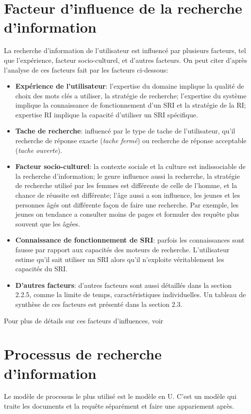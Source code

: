 \section{Facteur d'influence de la recherche d'information}
La recherche d'information de l'utilisateur est influencé par plusieurs facteurs, tel que l'expérience, facteur socio-culturel, et d'autres facteurs.
On peut citer d'après l'analyse de ces facteurs fait par \citeauthor{ri-sur-le-web} \citep{ri-sur-le-web} les facteurs ci-dessous:
\begin{itemize}
    \item \textbf{Expérience de l'utilisateur}: l'expertise du domaine implique la qualité de choix des mots clés a utiliser, la stratégie de recherche; l'expertise du système implique la connaissance de fonctionnement d'un SRI et la stratégie de la RI; expertise RI implique la capacité d'utiliser un SRI spécifique.
    \item \textbf{Tache de recherche}: influencé par le type de tache de l'utilisateur, qu'il recherche de réponse exacte (\textit{tache fermé}) ou recherche de réponse acceptable (\textit{tache ouverte}).
    \item \textbf{Facteur socio-culturel}: la contexte sociale et la culture est indissociable de la recherche d'information; le genre influence aussi la recherche, la stratégie de recherche utilisé par les femmes est différente de celle de l'homme, et la chance de réussite est différente; l'âge aussi a son influence, les jeunes et les personnes âgés ont différente façon de faire une recherche. Par exemple, les jeunes on tendance a consulter moins de pages et formuler des requête plus souvent que les âgées.
    \item \textbf{Connaissance de fonctionnement de SRI}: parfois les connaissances sont fausse par rapport aux capacités des moteurs de recherche. L'utilisateur estime qu'il sait utiliser un SRI alors qu'il n'exploite véritablement les capacités du SRI.
    \item \textbf{D'autres facteurs}: d'autres facteurs sont aussi détaillés dans la section 2.2.5, comme la limite de temps, caractéristiques individuelles. Un tableau de synthèse de ces facteurs est présenté dans la section 2.3.
\end{itemize}

Pour plus de détails sur ces facteurs d'influences, voir 

\section{Processus de recherche d'information}
\label{sec:processus-ri}
Le modèle de processus le plus utilisé est le modèle en U. C'est un modèle qui traite les documents et la requête séparément et faire une appariement après.

